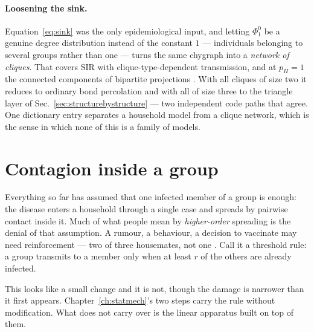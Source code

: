 \paragraph{Loosening the sink.} Equation~\eqref{eq:sink} was the only
epidemiological input, and letting $\Phi^{0}_{1}$ be a genuine degree
distribution instead of the constant $1$ --- individuals belonging to several
groups rather than one --- turns the same chygraph into a \emph{network of
cliques}. That covers SIR with clique-type-dependent transmission, and at
$p_{H}=1$ the connected components of bipartite projections
\citep{fujiki2024proj}. With all cliques of size two it reduces to ordinary bond
percolation and with all of size three to the triangle layer of
Sec.~\ref{sec:structurebystructure} --- two independent code paths that agree.
One dictionary entry separates a household model from a clique network, which
is the sense in which none of this is a family of models.

\section{Contagion inside a group}
\label{sec:groupcontagion}

Everything so far has assumed that one infected member of a group is enough:
the disease enters a household through a single case and spreads by pairwise
contact inside it. Much of what people mean by \emph{higher-order} spreading is
the denial of that assumption. A rumour, a behaviour, a decision to vaccinate
may need reinforcement --- two of three housemates, not one
\citep{watts2002,iacopini2019,stonge2021}. Call it a threshold rule: a group
transmits to a member only when at least $r$ of the others are already
infected.

This looks like a small change and it is not, though the damage is narrower than
it first appears. Chapter~\ref{ch:statmech}'s two steps carry the rule without
modification. What does not carry over is the linear apparatus built on top of
them.

